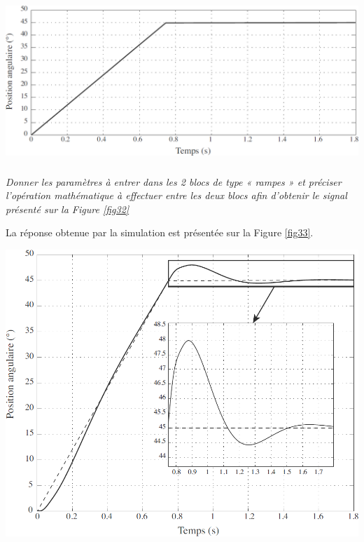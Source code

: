 \begin{multicols}{2}
\begin{multicols}{2}
\begin{center}
\includegraphics[width=\linewidth]{images/pt_32}
\end{center}





\subparagraph{}
\textit{Donner les paramètres à entrer dans les 2 blocs de type « rampes » et préciser l'opération mathématique à effectuer entre les deux blocs afin d'obtenir le signal présenté sur la Figure \ref{fig32}}
\ifprof
\begin{corrige}
\end{corrige}
\else
\fi



La réponse obtenue par la simulation est présentée sur la Figure \ref{fig33}.

\begin{center}
\includegraphics[width=\linewidth]{images/pt_33}
\end{center}



\end{multicols}
\end{multicols}
